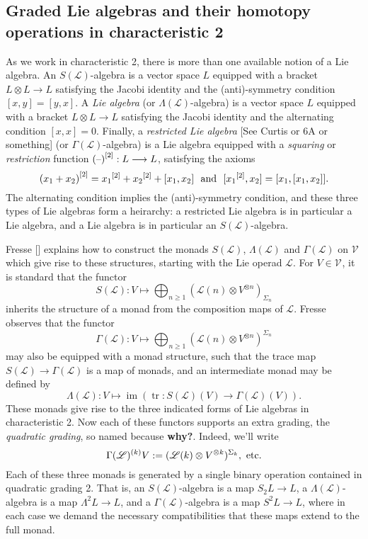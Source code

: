 \documentclass[11pt]{amsart}
\theoremstyle{plain}
\theoremstyle{definition}
\DeclareMathOperator{\im}{im}
\DeclareMathOperator{\trace}{tr}
\newcommand{\DASH}{\textup{--}}
\renewcommand{\to}{\longrightarrow}
\newcommand{\scrL}{\mathscr{L}}
\newcommand{\calV}{\mathcal{V}}
\theoremstyle{plain}
\newcommand{\LieOperad}{{\scrL}}
\newcommand{\restn}[1]{{#1}^{[2]}}
\newcommand{\vect}[2]{\calV^{#1}_{#2}}
\begin{document}
\begin{Lie algebras in characteristic 2 and their homotopy operations}

\section{Graded Lie algebras and their homotopy operations in characteristic 2}
As we work in characteristic 2, there is more than one available notion of a Lie algebra. An $S(\LieOperad)$-algebra is a vector space $L$ equipped with a bracket $L\otimes L\to L$ satisfying the Jacobi identity and the (anti)-symmetry condition $[x,y]=[y,x]$. A \emph{Lie algebra} (or $\Lambda(\LieOperad)$-algebra) is a vector space $L$ equipped with a bracket $L\otimes L\to L$ satisfying the Jacobi identity and the alternating condition $[x,x]=0$. Finally, a \emph{restricted Lie algebra} [See Curtis or 6A or something] (or $\Gamma(\LieOperad)$-algebra) is a Lie algebra equipped with a \emph{squaring} or \emph{restriction} function $\restn{(\DASH)}:L\to L$, satisfying the axioms
\[\restn{(x_1+x_2)}=\restn{x_1}+\restn{x_2}+[x_1,x_2]\textup{ \ and \ }[\restn{x_1},x_2]=[x_1,[x_1,x_2]].\]
The alternating condition implies the (anti)-symmetry condition, and these three types of Lie algebras form a heirarchy: a restricted Lie algebra is in particular a Lie algebra, and a Lie algebra is in particular an $S(\LieOperad)$-algebra.

Fresse [] explains how to construct the monads $S(\LieOperad)$, $\Lambda(\LieOperad)$ and $\Gamma(\LieOperad)$ on $\vect{}{}$ which give rise to these structures, starting with the Lie operad $\LieOperad$. For $V\in\vect{}{}$, it is standard that the functor
\[S(\LieOperad):V\mapsto \bigoplus_{n\geq1}(\LieOperad(n)\otimes V^{\otimes n})_{\Sigma_n}\]
inherits the structure of a monad from the composition maps of $\LieOperad$. Fresse observes that the functor
\[\Gamma(\LieOperad):V\mapsto \bigoplus_{n\geq1}(\LieOperad(n)\otimes V^{\otimes n})^{\Sigma_n}\]
may also be equipped with a monad structure, such that the trace map $S(\LieOperad)\to \Gamma(\LieOperad)$
is a map of monads, and an intermediate monad may be defined by
\[\Lambda(\LieOperad):V\mapsto\im(\trace:S(\LieOperad)(V)\to \Gamma(\LieOperad)(V)).\]
These monads give rise to the three indicated forms of Lie algebras in characteristic 2. Now each of these functors supports an extra grading, the \emph{quadratic grading}, so named because \textbf{why?}. Indeed, we'll write
\[\Gamma(\LieOperad)^{(k)}V:=(\LieOperad(k)\otimes V^{\otimes k})^{\Sigma_k},\textup{ etc}.\]
Each of these three monads is generated by a single binary operation contained in quadratic grading 2. That is, an $S(\LieOperad)$-algebra is a map $S_2L\to L$, a $\Lambda(\LieOperad)$-algebra is a map $\Lambda^2L\to L$, and a $\Gamma(\LieOperad)$-algebra is a map $S^2L\to L$, where in each case we demand the necessary compatibilities that these maps extend to the full monad. %


\end{Lie algebras in characteristic 2 and their homotopy operations}
\end{document}

